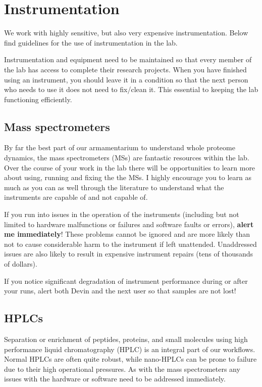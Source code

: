 \documentclass[
]{book}
\begin{document}
\hypertarget{instrumentation}{%
\section{Instrumentation}\label{instrumentation}}

We work with highly sensitive, but also very expensive instrumentation. Below find guidelines for the use of instrumentation in the lab.

Instrumentation and equipment need to be maintained so that every member of the lab has access to complete their research projects. When you have finished using an instrument, you should leave it in a condition so that the next person who needs to use it does not need to fix/clean it. This essential to keeping the lab functioning efficiently.

\hypertarget{mass-spectrometers}{%
\subsection{Mass spectrometers}\label{mass-spectrometers}}

By far the best part of our armamentarium to understand whole proteome dynamics, the mass spectrometers (MSs) are fantastic resources within the lab. Over the course of your work in the lab there will be opportunities to learn more about using, running and fixing the the MSs. I highly encourage you to learn as much as you can as well through the literature to understand what the instruments are capable of and not capable of.

If you run into issues in the operation of the instruments (including but not limited to hardware malfunctions or failures and software faults or errors), \textbf{alert me immediately}! These problems cannot be ignored and are more likely than not to cause considerable harm to the instrument if left unattended. Unaddressed issues are also likely to result in expensive instrument repairs (tens of thousands of dollars).

If you notice significant degradation of instrument performance during or after your runs, alert both Devin and the next user so that samples are not lost!

\hypertarget{hplcs}{%
\subsection{HPLCs}\label{hplcs}}

Separation or enrichment of peptides, proteins, and small molecules using high performance liquid chromatography (HPLC) is an integral part of our workflows. Normal HPLCs are often quite robust, while nano-HPLCs can be prone to failure due to their high operational pressures. As with the mass spectrometers any issues with the hardware or software need to be addressed immediately.
\end{document}
